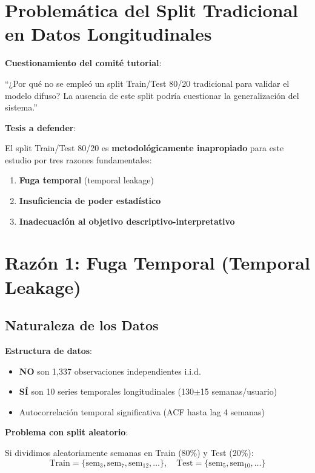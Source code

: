 \documentclass[12pt,letterpaper,twoside]{report}
\begin{document}
\begin{calculobox}
\section{Problemática del Split Tradicional en Datos Longitudinales}

\begin{hipotesisbox}
\textbf{Cuestionamiento del comité tutorial}:

``¿Por qué no se empleó un split Train/Test 80/20 tradicional para validar el modelo difuso? La ausencia de este split podría cuestionar la generalización del sistema.''

\textbf{Tesis a defender}:

El split Train/Test 80/20 es \textbf{metodológicamente inapropiado} para este estudio por tres razones fundamentales:
\begin{enumerate}[noitemsep]
    \item \textbf{Fuga temporal} (temporal leakage)
    \item \textbf{Insuficiencia de poder estadístico}
    \item \textbf{Inadecuación al objetivo descriptivo-interpretativo}
\end{enumerate}
\end{hipotesisbox}

\section{Razón 1: Fuga Temporal (Temporal Leakage)}

\subsection{Naturaleza de los Datos}

\begin{reglabox}
\textbf{Estructura de datos}:

\begin{itemize}[noitemsep]
    \item \textbf{NO} son 1,337 observaciones independientes i.i.d.
    \item \textbf{SÍ} son 10 series temporales longitudinales (130$\pm$15 semanas/usuario)
    \item Autocorrelación temporal significativa (ACF hasta lag 4 semanas)
\end{itemize}

\textbf{Problema con split aleatorio}:

Si dividimos aleatoriamente semanas en Train (80\%) y Test (20\%):
\begin{equation}
\text{Train} = \{\text{sem}_3, \text{sem}_7, \text{sem}_{12}, \ldots\}, \quad \text{Test} = \{\text{sem}_5, \text{sem}_{10}, \ldots\}
\end{equation}


\end{reglabox}
\end{calculobox}
\end{document}
